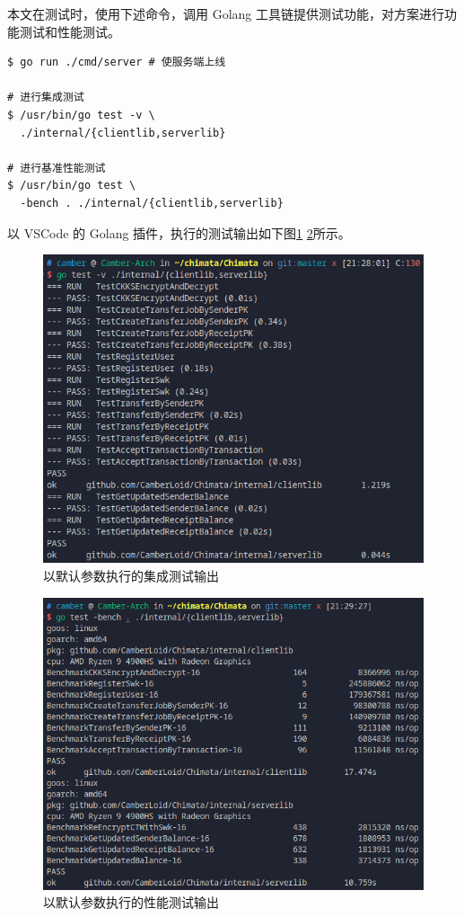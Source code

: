 本文在测试时，使用下述命令，调用 Golang 工具链提供测试功能，对方案进行功能测试和性能测试。

\begin{verbatim}
$ go run ./cmd/server # 使服务端上线

# 进行集成测试
$ /usr/bin/go test -v \
  ./internal/{clientlib,serverlib}

# 进行基准性能测试
$ /usr/bin/go test \
  -bench . ./internal/{clientlib,serverlib}
\end{verbatim}

以 VSCode 的 Golang 插件，执行的测试输出如下图\ref{Fig:test} \ref{Fig:benchmark}所示。 

\begin{figure}
    \centering
    \includegraphics[width=0.7\linewidth]{./Figures/Test.png}
    \caption{以默认参数执行的集成测试输出}\label{Fig:test}
\end{figure}

\begin{figure}
    \centering
    \includegraphics[width=0.7\linewidth]{./Figures/Bench_Overall.png}
    \caption{以默认参数执行的性能测试输出}\label{Fig:benchmark}
\end{figure}

